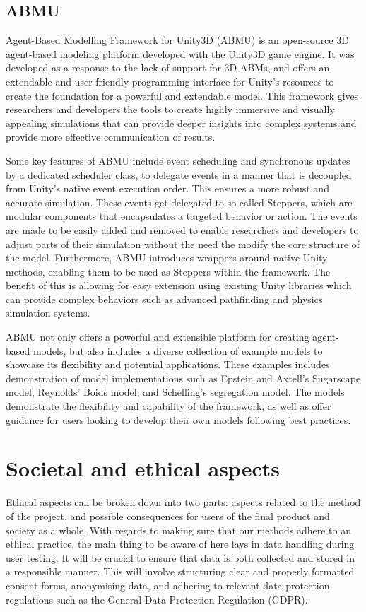     \subsection{ABMU}
        Agent-Based Modelling Framework for Unity3D (ABMU) is an open-source 3D agent-based modeling platform developed with the Unity3D game engine\cite{unity2021manual}. It was developed as a response to the lack of support for 3D ABMs\cite{abmu-paper}, and offers an extendable and user-friendly programming interface for Unity’s resources to create the foundation for a powerful and extendable model\cite{abmu2021}. This framework gives researchers and developers the tools to create highly immersive and visually appealing simulations that can provide deeper insights into complex systems and provide more effective communication of results.

        Some key features of ABMU include event scheduling and synchronous updates by a dedicated scheduler class, to delegate events in a manner that is decoupled from Unity’s native event execution order. This ensures a more robust and accurate simulation. These events get delegated to so called Steppers, which are modular components that encapsulates a targeted behavior or action. The events are made to be easily added and removed to enable researchers and developers to adjust parts of their simulation without the need the modify the core structure of the model. Furthermore, ABMU introduces wrappers around native Unity methods, enabling them to be used as Steppers within the framework. The benefit of this is allowing for easy extension using existing Unity libraries which can provide complex behaviors such as advanced pathfinding and physics simulation systems.

        ABMU not only offers a powerful and extensible platform for creating agent-based models, but also includes a diverse collection of example models to showcase its flexibility and potential applications. These examples includes demonstration of model implementations such as Epstein and Axtell's Sugarscape model\cite{epstein1996growing}, Reynolds' Boids model\cite{reynolds1987flocks}, and Schelling's segregation model\cite{schelling1971dynamic}. The models demonstrate the flexibility and capability of the framework, as well as offer guidance for users looking to develop their own models following best practices.
\section{Societal and ethical aspects}\label{ethics}
    Ethical aspects can be broken down into two parts: aspects related to the method of the project, and possible consequences for users of the final product and society as a whole.  With regards to making sure that our methods adhere to an ethical practice, the main thing to be aware of here lays in data handling during user testing. It will be crucial to ensure that data is both collected and stored in a responsible manner. This will involve structuring clear and properly formatted consent forms\cite{ico2021consent}, anonymising data, and adhering to relevant data protection regulations such as the General Data Protection Regulation (GDPR)\cite{gdpr2016}.

